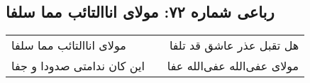 \begin{center}
\section*{رباعی شماره ۷۲: مولای اناالتائب مما سلفا}
\label{sec:0072}
\begin{longtable}{l p{0.5cm} r}
مولای اناالتائب مما سلفا
&&
هل تقبل عذر عاشق قد تلفا
\\
این کان ندامتی صدودا و جفا
&&
مولای عفی‌الله عفی‌الله عفا
\\
\end{longtable}
\end{center}
